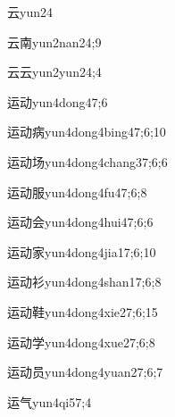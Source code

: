 \begin{verbete}{云}{yun2}{4}
\end{verbete}

\begin{verbete}{云南}{yun2nan2}{4;9}
\end{verbete}

\begin{verbete}{云云}{yun2yun2}{4;4}
\end{verbete}

\begin{verbete}{运动}{yun4dong4}{7;6}
\end{verbete}

\begin{verbete}{运动病}{yun4dong4bing4}{7;6;10}
\end{verbete}

\begin{verbete}{运动场}{yun4dong4chang3}{7;6;6}
\end{verbete}

\begin{verbete}{运动服}{yun4dong4fu4}{7;6;8}
\end{verbete}

\begin{verbete}{运动会}{yun4dong4hui4}{7;6;6}
\end{verbete}

\begin{verbete}{运动家}{yun4dong4jia1}{7;6;10}
\end{verbete}

\begin{verbete}{运动衫}{yun4dong4shan1}{7;6;8}
\end{verbete}

\begin{verbete}{运动鞋}{yun4dong4xie2}{7;6;15}
\end{verbete}

\begin{verbete}{运动学}{yun4dong4xue2}{7;6;8}
\end{verbete}

\begin{verbete}{运动员}{yun4dong4yuan2}{7;6;7}
\end{verbete}

\begin{verbete}{运气}{yun4qi5}{7;4}
\end{verbete}

